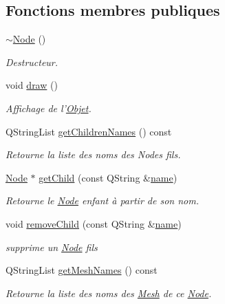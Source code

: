 \subsection*{Fonctions membres publiques}
\begin{DoxyCompactItemize}
\item 
\hyperlink{class_node_aa0840c3cb5c7159be6d992adecd2097c}{$\sim$\+Node} ()
\begin{DoxyCompactList}\small\item\em Destructeur. \end{DoxyCompactList}\item 
void \hyperlink{class_node_ab88c83ced58700a56de568f5b1e3c473}{draw} ()
\begin{DoxyCompactList}\small\item\em Affichage de l'\hyperlink{class_objet}{Objet}. \end{DoxyCompactList}\item 
Q\+String\+List \hyperlink{class_node_af7d6e2eab0af346f6690b4a2db12d953}{get\+Children\+Names} () const 
\begin{DoxyCompactList}\small\item\em Retourne la liste des noms des Nodes fils. \end{DoxyCompactList}\item 
\hyperlink{class_node}{Node} $\ast$ \hyperlink{class_node_afdc8a8f6c370f437037c85ffea5af4c1}{get\+Child} (const Q\+String \&\hyperlink{class_objet_a4a702c189bedcbf1e65da6aec72c8e44}{name})
\begin{DoxyCompactList}\small\item\em Retourne le \hyperlink{class_node}{Node} enfant à partir de son nom. \end{DoxyCompactList}\item 
void \hyperlink{class_node_af93b38928dc99bd2d3b1bfd982898519}{remove\+Child} (const Q\+String \&\hyperlink{class_objet_a4a702c189bedcbf1e65da6aec72c8e44}{name})
\begin{DoxyCompactList}\small\item\em supprime un \hyperlink{class_node}{Node} fils \end{DoxyCompactList}\item 
Q\+String\+List \hyperlink{class_node_a4a3bbcabcbd5423c297e287dd0ab7ecd}{get\+Mesh\+Names} () const 
\begin{DoxyCompactList}\small\item\em Retourne la liste des noms des \hyperlink{class_mesh}{Mesh} de ce \hyperlink{class_node}{Node}. \end{DoxyCompactList}\item 

\end{DoxyCompactItemize}
